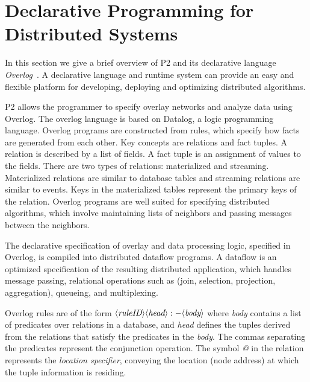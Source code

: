 \section{Declarative Programming for Distributed Systems}
\label{p2} 
In this section we give a brief overview of P2 and its declarative language \emph{Overlog}~\cite{p2}. A declarative language and runtime system can provide an easy and flexible platform for developing, deploying and optimizing distributed algorithms. 

P2 allows the programmer to specify overlay networks and analyze data using Overlog. The overlog language is based on Datalog, a logic programming language. Overlog programs are constructed from rules, which specify how facts are generated from each other. Key concepts are relations and fact tuples. A relation is described by a list of fields. A fact tuple is an assignment of values to the fields. There are two types of relations: materialized and streaming. Materialized relations are similar to database tables and streaming relations are similar to events. Keys in the materialized tables represent the primary keys of the relation. Overlog programs are well suited for specifying distributed algorithms, which involve maintaining lists of neighbors and passing messages between the neighbors. 

The declarative specification of overlay and data processing logic, specified in Overlog, is compiled into distributed dataflow programs. A dataflow is an optimized specification of the resulting distributed application, which handles message passing, relational operations such as (join, selection, projection, aggregation), queueing, and multiplexing. 

Overlog rules are of the form $\langle\emph{ruleID}\rangle \langle\emph{head}\rangle :- \langle\emph{body}\rangle$ where \emph{body} contains a list of predicates over relations in a database, and \emph{head} defines the tuples derived from the relations that satisfy the predicates in the \emph{body}. The commas separating the predicates represent the conjunction operation. The symbol \emph{@} in the relation represents the \emph{location specifier}, conveying the location (node address) at which the tuple information is residing.

